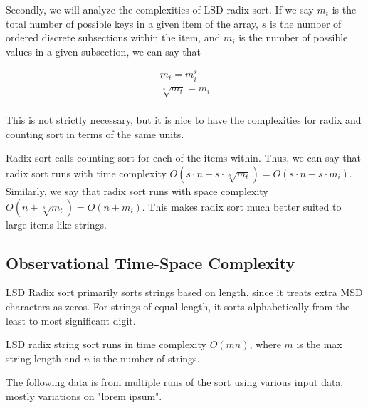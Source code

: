 \documentclass[12pt]{amsart}
\begin{document}
    Secondly, we will analyze the complexities of LSD radix
    sort. If we say $m_t$ is the total number of possible keys
    in a given item of the array, $s$ is the number of ordered
    discrete subsections within the item, and $m_i$ is the
    number of possible values in a given subsection, we can say
    that

    \[
    \begin{aligned}
        m_t = m_i^s            \\
        \sqrt[s]{m_t} = m_i    \\
    \end{aligned}
    \]

    This is not strictly necessary, but it is nice to have the
    complexities for radix and counting sort in terms of the
    same units.

    Radix sort calls counting sort for each of the items
    within. Thus, we can say that radix sort runs with time complexity
    $O(s \cdot n + s \cdot \sqrt[s]{m_t}) = O(s \cdot n + s \cdot m_i)$.
    Similarly, we say that radix sort runs with space complexity
    $O(n + \sqrt[s]{m_t}) = O(n + m_i)$. This makes radix sort
    much better suited to large items like strings.

    \subsection{Observational Time-Space Complexity}

    LSD Radix sort primarily sorts strings based on length,
    since it treats extra MSD characters as zeros. For strings
    of equal length, it sorts alphabetically from the least to
    most significant digit.

    LSD radix string sort runs in time complexity $O(mn)$, where
    $m$ is the max string length and $n$ is the number of
    strings.

    The following data is from multiple runs of the sort using
    various input data, mostly variations on "lorem ipsum".

    \newpage
\end{document}
